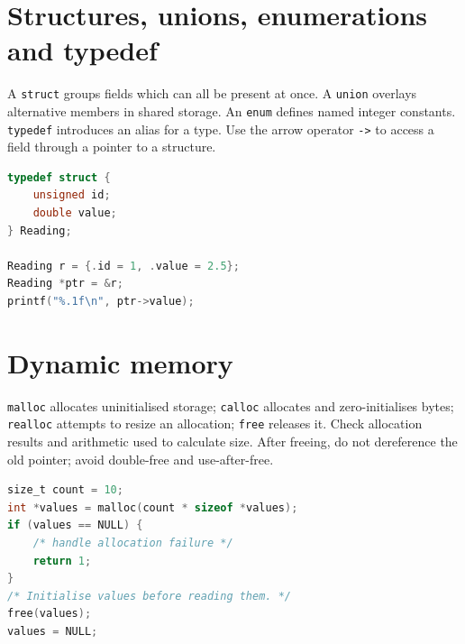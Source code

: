 \documentclass[11pt,a4paper]{article}
\begin{document}
\section{Structures, unions, enumerations and typedef}
A \texttt{struct} groups fields which can all be present at once. A \texttt{union} overlays alternative members in shared storage. An \texttt{enum} defines named integer constants. \texttt{typedef} introduces an alias for a type. Use the arrow operator \texttt{->} to access a field through a pointer to a structure.
\begin{lstlisting}[language=C]
typedef struct {
    unsigned id;
    double value;
} Reading;

Reading r = {.id = 1, .value = 2.5};
Reading *ptr = &r;
printf("%.1f\n", ptr->value);
\end{lstlisting}
\section{Dynamic memory}
\texttt{malloc} allocates uninitialised storage; \texttt{calloc} allocates and zero-initialises bytes; \texttt{realloc} attempts to resize an allocation; \texttt{free} releases it. Check allocation results and arithmetic used to calculate size. After freeing, do not dereference the old pointer; avoid double-free and use-after-free.
\begin{lstlisting}[language=C]
size_t count = 10;
int *values = malloc(count * sizeof *values);
if (values == NULL) {
    /* handle allocation failure */
    return 1;
}
/* Initialise values before reading them. */
free(values);
values = NULL;
\end{lstlisting}
\begin{center}\end{center}
\end{document}
